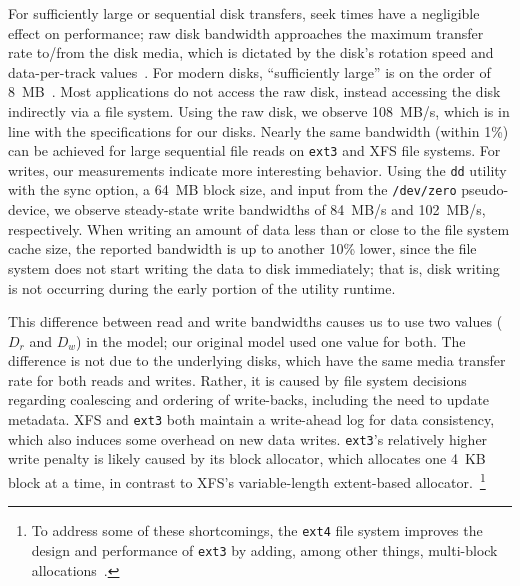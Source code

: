 For sufficiently large or sequential disk
transfers, seek times have a negligible effect on performance; raw
disk bandwidth approaches the maximum transfer rate to/from
the disk media, which is dictated by the disk's rotation speed
and data-per-track values~\cite{Ruemmler94local}.
For modern disks, ``sufficiently large'' is on the order of
8~MB~\cite{Wachs07local}.
Most applications do not access the raw disk, instead accessing
the disk indirectly via a file system.
Using the raw disk, we observe 108~MB/s, which is in line with the
specifications for our disks.
Nearly the same bandwidth (within 1\%) can be achieved for large
sequential file reads on \texttt{ext3} and XFS file systems.
For writes, our measurements indicate more interesting behavior.
Using the \texttt{dd} utility with the sync option, a 64~MB block size,
and input from the \texttt{/dev/zero} pseudo-device, we observe
steady-state write bandwidths of 84~MB/s and 102~MB/s, respectively.
When writing an amount of data less than or close to the file system
cache size, the reported bandwidth is up to another 10\% lower, since the file
system does not start writing the data to disk immediately; that is,
disk writing is not occurring during the early portion of the utility
runtime.

This difference between read and write bandwidths causes us to use
two values ($D_r$ and $D_w$) in the model; our original model used
one value for both.
The difference is not due to the underlying disks, which have the
same media transfer rate for both reads and writes.
Rather, it is caused by file system decisions regarding coalescing
and ordering of write-backs, including the need to update metadata.
XFS and \texttt{ext3} both maintain a write-ahead log for data consistency,
which also induces some overhead on new data writes.
\texttt{ext3}'s relatively higher write penalty is likely caused by its
block allocator, which allocates one 4~KB block at a time, in contrast
to XFS's variable-length extent-based allocator.~\footnote{To address some of these
shortcomings, the \texttt{ext4} file system improves the design and
performance of \texttt{ext3} by adding, among other things,
multi-block allocations~\cite{Kumar08}.}


